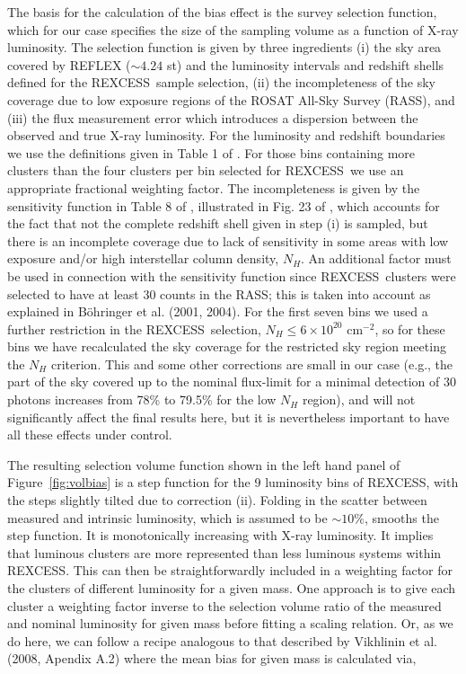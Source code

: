 \documentclass[oldversion]{aa}
\newcommand{\rexcess}{{\gwpfont REXCESS}}
\begin{document}
The basis for the calculation of the bias effect is the survey selection function,
which for our case specifies the size of the sampling volume as a function of 
X-ray luminosity. The selection function is given by three ingredients (i) the sky area covered by REFLEX ($\sim 4.24$ st) and the luminosity intervals and redshift shells defined for the \rexcess\ sample selection, (ii) the incompleteness of the sky coverage due to low exposure regions of the ROSAT All-Sky Survey (RASS), and (iii) the flux measurement
error which introduces a dispersion between the observed and true X-ray luminosity.
For the luminosity and redshift boundaries we use the definitions given in
Table 1 of \citet{boehringer07}. For those bins containing more clusters than 
the four clusters per bin selected for \rexcess\ we use an appropriate fractional weighting factor. The incompleteness is given by 
the sensitivity function in Table 8 of \citet{reflex}, illustrated in Fig. 23 of 
\citet{boehringer01}, which accounts for the
fact that not the complete redshift shell given in step (i) is sampled, but there
is an incomplete coverage due to lack of sensitivity in some areas with low 
exposure and/or high interstellar column density, $N_H$. An additional factor must be used in connection with the sensitivity function since \rexcess\ clusters were selected to have at least 30 counts
in the RASS;
this is taken into account as explained in B\"ohringer et al. (2001, 2004). For the first seven bins 
we used a further restriction in the \rexcess\ selection, $N_H \le 6 \times 10^{20}$ cm$^{-2}$, so for these bins we have recalculated the sky coverage for the
restricted sky region meeting the $N_H$ criterion. This and some other corrections
are small in our case (e.g., the part of the sky covered up to the nominal 
flux-limit for a minimal detection of 30 photons increases from 78\% to 79.5\%
for the low $N_H$ region), and will not significantly affect the final results here, but it is nevertheless important to have all these effects under control.

The resulting selection volume
function shown in the left hand panel of Figure~\ref{fig:volbias} is a step function for the 9 luminosity bins of \rexcess, with the steps slightly
tilted due to correction (ii). Folding in the scatter between measured and
intrinsic luminosity, which is assumed to be $\sim 10\%$, smooths the step function. It is monotonically increasing with X-ray luminosity. 
It implies that luminous clusters are more represented than less luminous systems within \rexcess. This can then be straightforwardly included in a weighting factor for the clusters of different luminosity for a given mass. 
One approach is to give each cluster a weighting factor inverse to the selection volume ratio of the measured and nominal luminosity for given mass before fitting a scaling relation. Or, as we do here, we can follow a recipe analogous to that described by  Vikhlinin et al. (2008, Apendix A.2) where the mean bias for given mass is calculated via,
\end{document}
